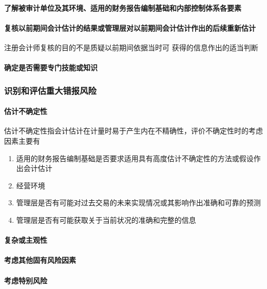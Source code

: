 \documentclass[UTF8,12pt]{ctexart}
\numberwithin{equation}{section} %
\numberwithin{figure}{section}
\numberwithin{table}{section}
\begin{document}
	\paragraph{了解被审计单位及其环境、适用的财务报告编制基础和内部控制体系各要素}
	
	\paragraph{复核以前期间会计估计的结果或管理层对以前期间会计估计作出的后续重新估计}
	注册会计师复核的目的不是质疑以前期间依据当时可 获得的信息作出的适当判断
	
	\paragraph{确定是否需要专门技能或知识}
	
	\subsubsection{识别和评估重大错报风险}
	
	\paragraph{估计不确定性}
	估计不确定性指会计估计在计量时易于产生内在不精确性，评价不确定性时的考虑因素主要有
	\begin{enumerate}
		\item 适用的财务报告编制基础是否要求适用具有高度估计不确定性的方法或假设作出会计估计
		
		\item 经营环境
		
		\item 管理层是否有可能对过去交易的未来实现情况或其影响作出准确和可靠的预测
		
		\item 管理层是否有可能获取关于当前状况的准确和完整的信息
	\end{enumerate}
	
	
	\paragraph{复杂或主观性}
	
	\paragraph{考虑其他固有风险因素}
	
	\paragraph{考虑特别风险}
	
\end{document}
